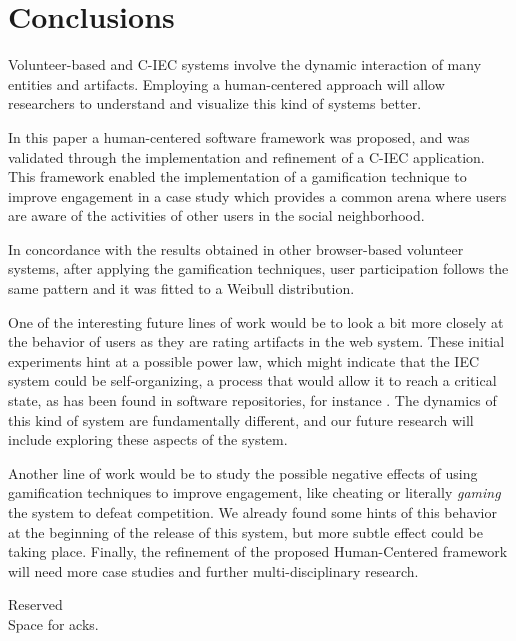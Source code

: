 \section{Conclusions}
\label{sec:conclusions}

Volunteer-based and C-IEC systems involve the dynamic 
interaction of many entities and artifacts. Employing a human-centered approach 
will allow researchers to understand and visualize this kind of
systems better. %

In this paper a human-centered software framework was proposed, and was validated
through the implementation and refinement of a C-IEC application.
This framework enabled the implementation of a gamification technique 
to improve engagement in a case study which provides a common arena where users are aware of the
activities of other users in the social neighborhood. 

In concordance with the results obtained in other 
browser-based volunteer systems, after 
applying the gamification techniques, user participation follows the
same pattern and it was fitted to a Weibull distribution. 

One of the interesting future lines of work would be to look a bit
more closely at the behavior of users as they are rating artifacts 
in the web system. These initial experiments hint at a possible power law, which might indicate that
the IEC system could be self-organizing, a process that would allow it
to reach a critical state, as has been found in software repositories,
for instance \cite{Merelo2016:repomining}. 
The dynamics of this kind of system are fundamentally different, and our future research will
include exploring these aspects of the system. 

Another line of work would be to study the possible negative effects of using  
gamification techniques to improve engagement, like cheating or
literally {\em gaming} the system to defeat competition. We already
found some hints of this behavior at the beginning of the release of
this system, but more subtle effect could be taking place. 
Finally, the refinement of the proposed Human-Centered framework will need
more case studies and further multi-disciplinary research. 

\begin{acks}
  Reserved\\
  Space for acks. 



\end{acks}
